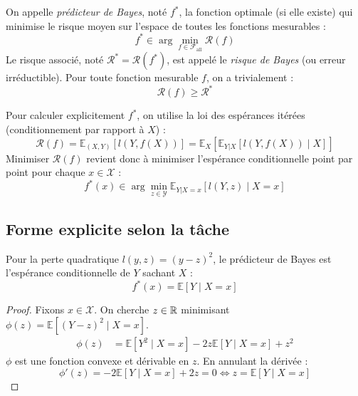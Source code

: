 \begin{definition}
    On appelle \emph{prédicteur de Bayes}, noté $f^*$, la fonction optimale (si elle existe) qui minimise le risque moyen sur l'espace de toutes les fonctions mesurables :
    \begin{equation}
        \boxed{f^* \in \arg \min_{f \in \mathcal{F}_{\text{all}}} \mathcal{R}(f)}
    \end{equation}
    Le risque associé, noté $\mathcal{R}^* = \mathcal{R}(f^*)$, est appelé le \emph{risque de Bayes} (ou erreur irréductible). Pour toute fonction mesurable $f$, on a trivialement :
    \begin{equation}
        \mathcal{R}(f) \geqslant \mathcal{R}^*
    \end{equation}
\end{definition}

Pour calculer explicitement $f^*$, on utilise la loi des espérances itérées (conditionnement par rapport à $X$) :
\begin{equation}
    \mathcal{R}(f) = \mathbb{E}_{(X, Y)}\left[ l(Y, f(X)) \right] = \mathbb{E}_X \left[ \mathbb{E}_{Y|X} \left[ l(Y, f(X)) \mid X \right] \right]
\end{equation}
Minimiser $\mathcal{R}(f)$ revient donc à minimiser l'espérance conditionnelle point par point pour chaque $x \in \mathcal{X}$ :
\begin{equation}
    f^*(x) \in \arg \min_{z \in \mathcal{Y}} \mathbb{E}_{Y|X=x}\left[ l(Y, z) \mid X = x \right]
\end{equation}

\subsection{Forme explicite selon la tâche}

\begin{proposition}
    Pour la perte quadratique $l(y, z) = (y - z)^2$, le prédicteur de Bayes est l'espérance conditionnelle de $Y$ sachant $X$ :
    \begin{equation}
        \boxed{f^*(x) = \mathbb{E}[Y \mid X = x]}
    \end{equation}
\end{proposition}

\begin{proof}
    Fixons $x \in \mathcal{X}$. On cherche $z \in \mathbb{R}$ minimisant $\phi(z) = \mathbb{E}\left[(Y - z)^2 \mid X = x\right]$.
    \begin{align*}
        \phi(z) &= \mathbb{E}\left[Y^2 \mid X = x\right] - 2z \mathbb{E}\left[Y \mid X = x\right] + z^2
    \end{align*}
    $\phi$ est une fonction convexe et dérivable en $z$. En annulant la dérivée :
    $$\phi'(z) = -2\mathbb{E}[Y \mid X = x] + 2z = 0 \iff z = \mathbb{E}[Y \mid X = x]$$
\end{proof}

